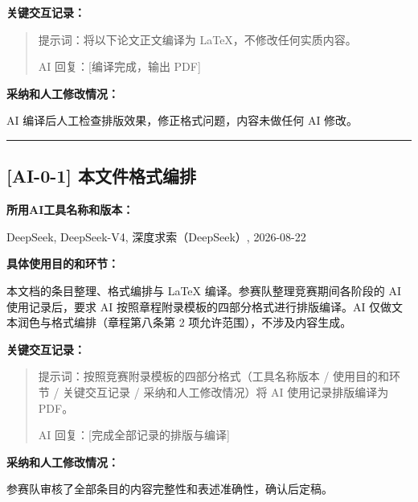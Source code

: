 \documentclass[12pt,a4paper]{ctexart}
\begin{document}
\textbf{关键交互记录：}

\begin{quote}
提示词：将以下论文正文编译为 LaTeX，不修改任何实质内容。

AI 回复：[编译完成，输出 PDF]
\end{quote}

\textbf{采纳和人工修改情况：}

AI 编译后人工检查排版效果，修正格式问题，内容未做任何 AI 修改。

\vspace{1em}
\hrule
\vspace{1em}

\subsection*{[AI-0-1] 本文件格式编排}

\textbf{所用AI工具名称和版本：}

DeepSeek, DeepSeek-V4, 深度求索（DeepSeek）, 2026-08-22

\textbf{具体使用目的和环节：}

本文档的条目整理、格式编排与 LaTeX 编译。参赛队整理竞赛期间各阶段的 AI 使用记录后，要求 AI 按照章程附录模板的四部分格式进行排版编译。AI 仅做文本润色与格式编排（章程第八条第 2 项允许范围），不涉及内容生成。

\textbf{关键交互记录：}

\begin{quote}
提示词：按照竞赛附录模板的四部分格式（工具名称版本 / 使用目的和环节 / 关键交互记录 / 采纳和人工修改情况）将 AI 使用记录排版编译为 PDF。

AI 回复：[完成全部记录的排版与编译]
\end{quote}

\textbf{采纳和人工修改情况：}

参赛队审核了全部条目的内容完整性和表述准确性，确认后定稿。
\end{document}
